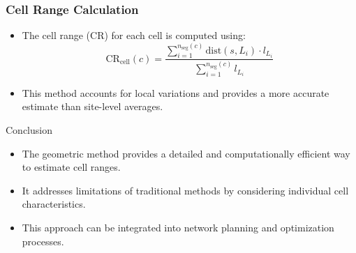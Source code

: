 \begin{frame}
\frametitle{Cell Range Calculation}
\begin{itemize}
    \item The cell range (CR) for each cell is computed using:
    \begin{equation}
        \text{CR}_{\text{cell}}(c) = \frac{\sum_{i=1}^{n_{\text{seg}}(c)} \text{dist}(s, L_i) \cdot l_{L_i}}{\sum_{i=1}^{n_{\text{seg}}(c)} l_{L_i}}
    \end{equation}
    \item This method accounts for local variations and provides a more accurate estimate than site-level averages.
\end{itemize}
\begin{block}{Conclusion}
    \begin{itemize}
        \item The geometric method provides a detailed and computationally efficient way to estimate cell ranges.
        \item It addresses limitations of traditional methods by considering individual cell characteristics.
        \item This approach can be integrated into network planning and optimization processes.
    \end{itemize}
\end{block}
\end{frame}

